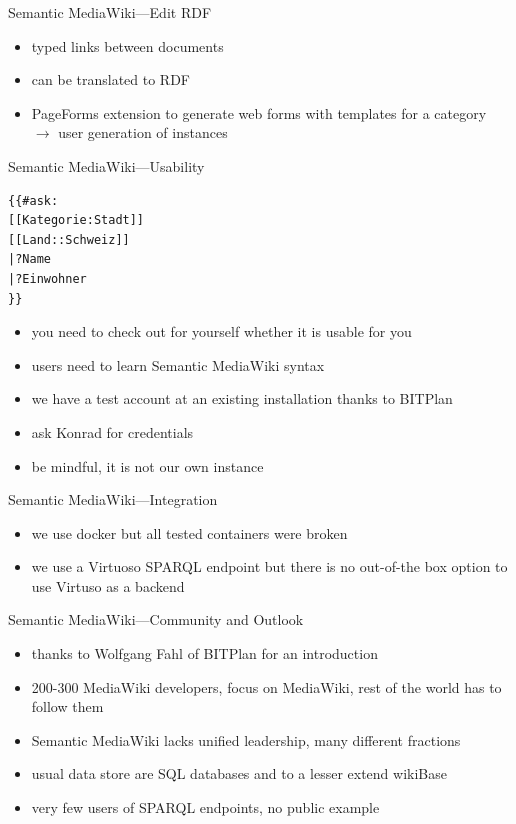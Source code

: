 \documentclass[aspectratio=1610]{beamer}
\begin{document}
\begin{frame}{Semantic MediaWiki---Edit RDF}
\begin{itemize}
\item typed links between documents
\item can be translated to RDF
\item PageForms extension to generate web forms with templates for a category $\rightarrow$ user generation of instances
\end{itemize}
\end{frame}

\begin{frame}[fragile]{Semantic MediaWiki---Usability}
\begin{verbatim}
{{#ask:
[[Kategorie:Stadt]]
[[Land::Schweiz]]
|?Name
|?Einwohner
}}
\end{verbatim}
\begin{itemize}
\item you need to check out for yourself whether it is usable for you
\item users need to learn Semantic MediaWiki syntax
\item we have a test account at an existing installation thanks to BITPlan
\item ask Konrad for credentials
\item be mindful, it is not our own instance
\end{itemize}
\end{frame}

\begin{frame}{Semantic MediaWiki---Integration}
\begin{itemize}
\item we use docker but all tested containers were broken
\item we use a Virtuoso SPARQL endpoint but there is no out-of-the box option to use Virtuso as a backend
\end{itemize}
\end{frame}

\begin{frame}{Semantic MediaWiki---Community and Outlook}
\begin{itemize}
\item thanks to Wolfgang Fahl of BITPlan for an introduction
\item 200-300 MediaWiki developers, focus on MediaWiki, rest of the world has to follow them
\item Semantic MediaWiki lacks unified leadership, many different fractions
\item usual data store are SQL databases and to a lesser extend wikiBase
\item very few users of SPARQL endpoints, no public example 
\end{itemize}
\end{frame}
\end{document}
